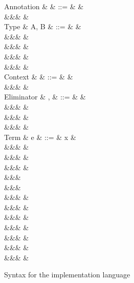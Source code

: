\begin{figure}
\begin{syntaxfig}
\mbox{Annotation}
&
\alpha
&
::=
&
\top
&
\\
&&&
\bot
&
\\[2mm]
\mbox{Type}
&
A, B
&
::=
&
\tyBool
&
\\
&&&
\tyInt
&
\\
&&&
\tyList
&
\\
&&&
&
\\
&&&
&
\\[2mm]
\mbox{Context}
&
\Gamma
&
::=
&
\cxtEmpty
&
\\
&&&
&
\\[2mm]
\mbox{Eliminator}
&
\sigma, \tau
&
::=
&
&
\\
&&&
&
\\
&&&
&
\\
&&&
&
\\[2mm]
\mbox{Term}
&
e
&
::=
&
x
&
\\
&&&
\annot{\exTrue}{\alpha} \mid \annot{\exFalse}{\alpha}
&
\\
&&&
&
\\
&&&
&
\\
&&&
\\
&&&
\\
&&&
&
\\
&&&
&
\\
&&&
&
\\
&&&
\annot{\exNil}{\alpha}
&
\\
&&&
&
\\
&&&
&
\\
&&&
&
\end{syntaxfig}
\caption{Syntax for the implementation language}
\label{fig:impl-language:syntax}
\end{figure}
